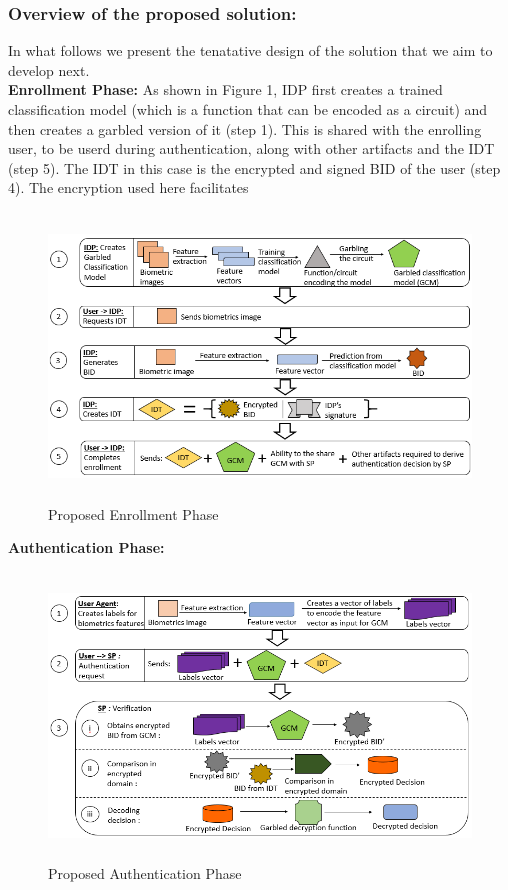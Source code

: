 \documentclass[10pt]{article}
\begin{document}

\subsubsection*{Overview of the proposed solution:}
In what follows we present the tenatative design of the solution that we aim to develop next.\\

\textbf{Enrollment Phase:}
As shown in Figure 1, IDP first creates a trained classification model (which is a function that can be encoded as a circuit) and then creates a 
garbled version of it (step 1). This is shared with the enrolling user, to be userd during authentication, along with other artifacts and the IDT 
(step 5). The IDT in this case is the encrypted and signed BID of the user (step 4). The encryption used here facilitates 
\begin{figure}[H]
\centering
\includegraphics[height=3.00in,width=5.00in]{enrollment}
\caption{Proposed Enrollment Phase}
\label{example}
\end{figure}

\textbf{Authentication Phase:}
\begin{figure}[H]
\centering
\includegraphics[height=3.00in,width=5.00in]{authentication}
\caption{Proposed Authentication Phase}
\label{example}
\end{figure}
\end{document}
